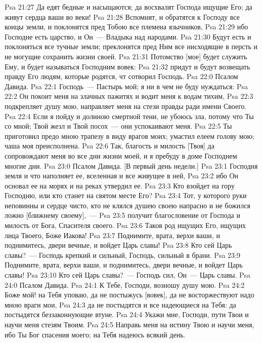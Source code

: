 \vs Psa 21:27 Да едят бедные и насыщаются; да восхвалят Господа ищущие Его; да живут сердца ваши во веки!
\vs Psa 21:28 Вспомнят, и обратятся к Господу все концы земли, и поклонятся пред Тобою все племена язычников,
\vs Psa 21:29 ибо Господне есть царство, и Он~--- Владыка над народами.
\vs Psa 21:30 Будут есть и поклоняться все тучные земли; преклонятся пред Ним все нисходящие в персть и не могущие сохранить жизни своей.
\vs Psa 21:31 Потомство [мое] будет служить Ему, и будет называться Господним вовек:
\vs Psa 21:32 придут и будут возвещать правду Его людям, которые родятся, чт сотворил Господь.
\vs Psa 22:0 Псалом Давида.
\rsbpar\vs Psa 22:1 Господь~--- Пастырь мой; я ни в чем не буду нуждаться:
\vs Psa 22:2 Он покоит меня на злачных пажитях и водит меня к водам тихим,
\vs Psa 22:3 подкрепляет душу мою, направляет меня на стези правды ради имени Своего.
\vs Psa 22:4 Если я пойду и долиною смертной тени, не убоюсь зла, потому что Ты со мной; Твой жезл и Твой посох~--- они успокаивают меня.
\vs Psa 22:5 Ты приготовил предо мною трапезу в виду врагов моих; умастил елеем голову мою; чаша моя преисполнена.
\vs Psa 22:6 Так, благость и милость [Твоя] да сопровождают меня во все дни жизни моей, и я пребуду в доме Господнем многие дни.
\vs Psa 23:0 Псалом Давида. [В первый день недели.]
\rsbpar\vs Psa 23:1 Господня земля и что наполняет ее, вселенная и все живущее в ней,
\vs Psa 23:2 ибо Он основал ее на морях и на реках утвердил ее.
\vs Psa 23:3 Кто взойдет на гору Господню, или кто станет на святом месте Его?
\vs Psa 23:4 Тот, у которого руки неповинны и сердце чисто, кто не клялся душею своею напрасно и не божился ложно [ближнему своему],~---
\vs Psa 23:5  получит благословение от Господа и милость от Бога, Спасителя своего.
\vs Psa 23:6 Таков род ищущих Его, ищущих лица Твоего, Боже Иакова!
\vs Psa 23:7 Поднимите, врата, верхи ваши, и поднимитесь, двери вечные, и войдет Царь славы!
\vs Psa 23:8 Кто сей Царь славы?~--- Господь крепкий и сильный, Господь, сильный в брани.
\vs Psa 23:9 Поднимите, врата, верхи ваши, и поднимитесь, двери вечные, и войдет Царь славы!
\vs Psa 23:10 Кто сей Царь славы?~--- Господь сил, Он~--- Царь славы.
\vs Psa 24:0 Псалом Давида.
\rsbpar\vs Psa 24:1 К Тебе, Господи, возношу душу мою.
\vs Psa 24:2 Боже мой! на Тебя уповаю, да не постыжусь [вовек], да не восторжествуют надо мною враги мои,
\vs Psa 24:3 да не постыдятся и все надеющиеся на Тебя: да постыдятся беззаконнующие втуне.
\vs Psa 24:4 Укажи мне, Господи, пути Твои и научи меня стезям Твоим.
\vs Psa 24:5 Направь меня на истину Твою и научи меня, ибо Ты Бог спасения моего; на Тебя надеюсь всякий день.
